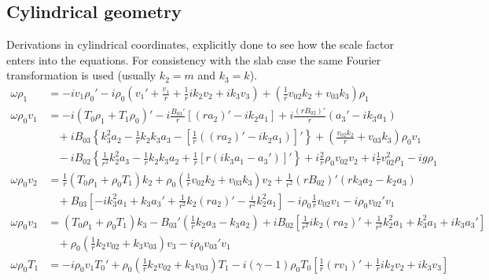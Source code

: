 \documentclass[11pt, fleqn]{article}
\begin{document}
\subsection{Cylindrical geometry}
Derivations in cylindrical coordinates, explicitly done to see how the scale factor enters into the equations. For consistency with the slab case the same Fourier transformation is used (usually $k_2 = m$ and $k_3 = k$).
\begin{equation}
	\begin{aligned}
		\omega \rho_1			&= -iv_1\rho_0' - i\rho_0\left(v_1' + \frac{v_1}{r} + \frac{1}{r}ik_2v_2 + ik_3v_3\right) + \left(\frac{1}{r}v_{02}k_2 + v_{03}k_3\right)\rho_1																									\\[8pt]
		\omega \rho_0 v_1 &= -i\left(T_0\rho_1 + T_1\rho_0\right)' - i\frac{B_{03}'}{r}\left[(ra_2)' - ik_2a_1\right] + i\frac{(rB_{02})'}{r}\left(a_3' - ik_3a_1\right)																									\\
											&~~~~ + iB_{03}\left\{k_3^2a_2 - \frac{1}{r}k_2k_3a_3 - \left[\frac{1}{r}\left((ra_2)' - ik_2a_1\right)\right]'\right\} + \left(\frac{v_{02}k_2}{r} + v_{03}k_3\right)\rho_0v_1									\\
											&~~~~ - iB_{02}\left\{\frac{1}{r^2}k_2^2a_3 - \frac{1}{r}k_2k_3a_2 + \frac{1}{r}\left[r\left(ik_3a_1 - a_3'\right)\right]'\right\} + i\frac{2}{r}\rho_0v_{02}v_2 + i\frac{1}{r}v_{02}^2\rho_1 - ig\rho_1		\\[8pt]
		\omega \rho_0 v_2 &= \frac{1}{r}(T_0\rho_1 + \rho_0T_1)k_2 +\rho_0\left(\frac{1}{r}v_{02}k_2 + v_{03}k_3\right)v_2 + \frac{1}{r^2}(rB_{02})'(rk_3a_2 - k_2a_3)																										\\
											&~~~~ + B_{03}\left[-ik_3^2a_1 + k_3a_3' + \frac{1}{r^2}k_2(ra_2)' - \frac{i}{r^2}k_2^2a_1\right] - i\rho_0\frac{1}{r}v_{02}v_1 - i\rho_0v_{02}'v_1																							\\[8pt]
		\omega \rho_0 v_3 &= (T_0\rho_1 + \rho_0T_1)k_3 - B_{03}'\left(\frac{1}{r}k_2a_3 - k_3a_2\right) + iB_{02}\left[\frac{1}{r^2}ik_2(ra_2)' + \frac{1}{r^2}k_2^2a_1 + k_3^2a_1 + ik_3a_3'\right]											\\
											&~~~~ + \rho_0\left(\frac{1}{r}k_2v_{02} + k_3v_{03}\right)v_3 - i\rho_0v_{03}'v_1																																																							\\[8pt]
		\omega \rho_0 T_1 &= -i\rho_0v_1T_0' +\rho_0\left(\frac{1}{r}k_2v_{02} + k_3v_{03}\right)T_1 - i(\gamma - 1)\rho_0T_0\left[\frac{1}{r}(rv_1)' + \frac{1}{r}ik_2v_2 + ik_3v_3\right]																\\

\end{aligned}
\end{equation}
\end{document}
